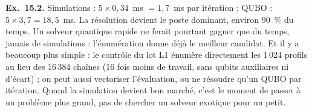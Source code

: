 \textbf{Ex.~15.2.} Simulations : $5\times0{,}34$~ms $=1{,}7$~ms par itération ; QUBO : $5\times3{,}7=18{,}5$~ms. La résolution devient le poste dominant, environ 90~\% du temps. Un solveur quantique rapide ne ferait pourtant gagner que du temps, jamais de simulations : l'énumération donne déjà le meilleur candidat. Et il y a beaucoup plus simple : le contrôle du lot L1 énumère directement les 1\,024 profils au lieu des 16\,384 chaînes (16 fois moins de travail, sans qubits auxiliaires ni d'écart) ; on peut aussi vectoriser l'évaluation, ou ne résoudre qu'un QUBO par itération. Quand la simulation devient bon marché, c'est le moment de passer à un problème plus grand, pas de chercher un solveur exotique pour un petit.
